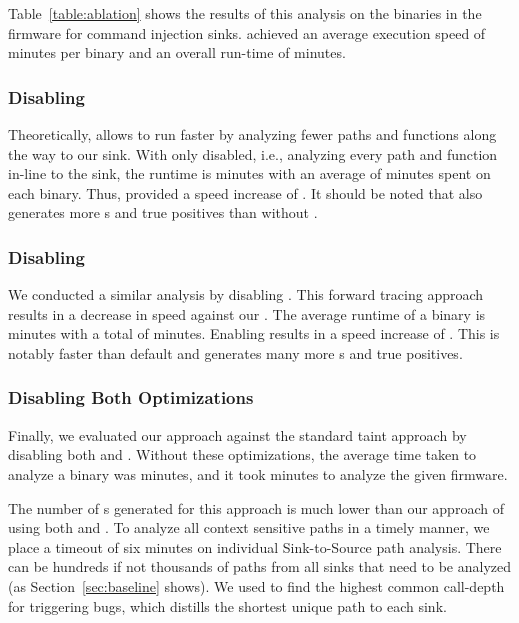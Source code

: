 Table~\ref{table:ablation} shows the results of this analysis on the \ablationSampleBins binaries in the firmware for command injection sinks.
\mango achieved an average execution speed of  minutes per binary and an overall run-time of  minutes.

\subsubsection{Disabling \assumed}

Theoretically, \assumed allows \mango to run faster by analyzing fewer paths and functions along the way to our sink.
With only \assumed disabled, i.e., analyzing every path and function in-line to the sink, the runtime is \assumedTotal minutes with an average of \assumedAverageMin minutes spent on each binary.
Thus, \assumed provided a speed increase of \assumedPercentage.
It should be noted that \assumed also generates more \trupoc{}s and true positives than \mango without \assumed.

\subsubsection{Disabling \rev}

We conducted a similar analysis by disabling \rev.
This forward tracing approach results in a decrease in speed against our \rev.
The average runtime of a binary is \traceAverageMin minutes with a total of \traceTotal minutes.
Enabling \rev results in a speed increase of \tracePercentage.
This is notably faster than default \mango and generates many more \trupoc{}s and true positives.

\subsubsection{Disabling Both Optimizations}
Finally, we evaluated our approach against the standard taint approach by disabling both \assumed and \rev.
Without these optimizations, the average time taken to analyze a binary was \allAverageMin minutes, and it took \allTotal minutes to analyze the given firmware.

The number of \trupoc{}s generated for this approach is much lower than our approach of using both \assumed and \rev.
To analyze all context sensitive paths in a timely manner, we place a timeout of six minutes on individual Sink-to-Source path analysis.
There can be hundreds if not thousands of paths from all sinks that need to be analyzed (as Section~\ref{sec:baseline} shows).
We used \rev to find the highest common call-depth for triggering bugs, which distills the shortest unique path to each sink.

